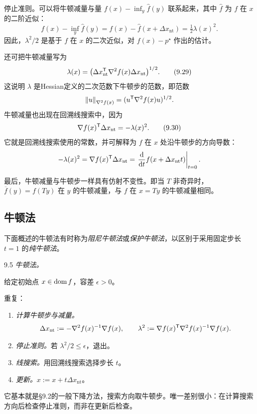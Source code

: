 停止准则。可以将牛顿减量与量 $f(x)-\inf_y\widehat f(y)$ 联系起来，其中 $\widehat f$ 为 $f$ 在 $x$ 的二阶近似：
\[
f(x)-\inf_y\widehat f(y)=f(x)-\widehat f(x+\Delta x_{\mathrm{nt}})
=\tfrac12\lambda(x)^2.
\]
因此，$\lambda^2/2$ 是基于 $f$ 在 $x$ 的二次近似，对 $f(x)-p^\star$ 作出的估计。

还可把牛顿减量写为
\begin{equation}
\lambda(x)=\bigl(\Delta x_{\mathrm{nt}}^\mathsf T\nabla^2f(x)\Delta x_{\mathrm{nt}}\bigr)^{1/2}.\tag{9.29}
\end{equation}
这说明 $\lambda$ 是Hessian定义的二次范数下牛顿步的范数，即范数
\[
\left\lVert u\right\rVert_{\nabla^2f(x)}=(u^\mathsf T\nabla^2f(x)u)^{1/2}.
\]
牛顿减量也出现在回溯线搜索中，因为
\begin{equation}
\nabla f(x)^\mathsf T\Delta x_{\mathrm{nt}}=-\lambda(x)^2.\tag{9.30}
\end{equation}
它就是回溯线搜索使用的常数，并可解释为 $f$ 在 $x$ 处沿牛顿步的方向导数：
\[
-\lambda(x)^2=\nabla f(x)^\mathsf T\Delta x_{\mathrm{nt}}
=\left.\frac{\mathrm d}{\mathrm dt}f(x+\Delta x_{\mathrm{nt}}t)\right|_{t=0}.
\]

最后，牛顿减量与牛顿步一样具有仿射不变性。即当 $T$ 非奇异时，$\overline f(y)=f(Ty)$ 在 $y$ 的牛顿减量，与 $f$ 在 $x=Ty$ 的牛顿减量相同。

\subsection{牛顿法}
下面概述的牛顿法有时称为\emph{阻尼牛顿法}或\emph{保护牛顿法}，以区别于采用固定步长 $t=1$ 的\emph{纯牛顿法}。

\begin{origalgorithm}{9.5}
\emph{牛顿法。}

给定初始点 $x\in\operatorname{dom} f$，容差 $\epsilon>0$。

重复：
\begin{enumerate}
\item \emph{计算牛顿步与减量。}
\[
\Delta x_{\mathrm{nt}}:=-\nabla^2f(x)^{-1}\nabla f(x),\qquad
\lambda^2:=\nabla f(x)^\mathsf T\nabla^2f(x)^{-1}\nabla f(x).
\]
\item \emph{停止准则。}若 $\lambda^2/2\le\epsilon$，退出。
\item \emph{线搜索。}用回溯线搜索选择步长 $t$。
\item \emph{更新。}$x:=x+t\Delta x_{\mathrm{nt}}$。
\end{enumerate}
\end{origalgorithm}

它基本就是§9.2的一般下降方法，搜索方向取牛顿步。唯一差别很小：在计算搜索方向后检查停止准则，而非在更新后检查。

